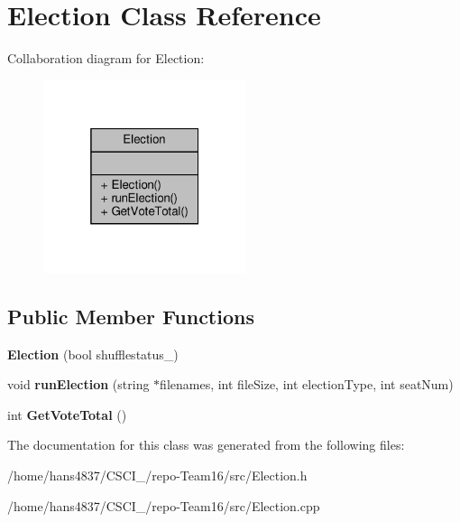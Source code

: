 \hypertarget{classElection}{}\section{Election Class Reference}
\label{classElection}


Collaboration diagram for Election\+:
\nopagebreak
\begin{figure}[H]
\begin{center}
\leavevmode
\includegraphics[width=169pt]{classElection__coll__graph}
\end{center}
\end{figure}
\subsection*{Public Member Functions}
\begin{DoxyCompactItemize}
\item 
\mbox{\label{classElection_af00d655bcd6df012b8442b1b58f4d6c9}} 
{\bfseries Election} (bool shufflestatus\+\_\+)
\item 
\mbox{\label{classElection_a7d5ab53dbe8b72de6c7442715601c842}} 
void {\bfseries run\+Election} (string $\ast$filenames, int file\+Size, int election\+Type, int seat\+Num)
\item 
\mbox{\label{classElection_a1c41b29c48ed8e6c612fe2ba44222b5b}} 
int {\bfseries Get\+Vote\+Total} ()
\end{DoxyCompactItemize}


The documentation for this class was generated from the following files\+:\begin{DoxyCompactItemize}
\item 
/home/hans4837/\+C\+S\+C\+I\+\_/repo-\/\+Team16/src/Election.\+h\item 
/home/hans4837/\+C\+S\+C\+I\+\_/repo-\/\+Team16/src/Election.\+cpp\end{DoxyCompactItemize}
